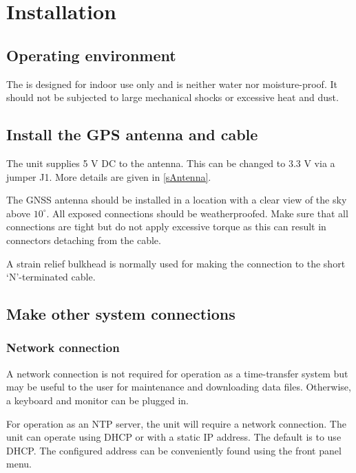 
\section{Installation}

\subsection{Operating environment}

The \sysname{} is designed for indoor use only and is neither water nor moisture-proof.
It should not be subjected to large mechanical shocks or excessive heat and dust.

\subsection{Install the GPS antenna and cable}

The unit supplies 5 V DC to the antenna. This can be changed to 3.3 V via a jumper J1.
More details are given in \ref{sAntenna}.

The GNSS antenna should be installed in a location with a clear
view of the sky above $10^{\circ}$. All exposed connections should be
weatherproofed. Make sure that all connections are tight but do not apply
excessive torque as this can result in connectors detaching from the cable.

A strain relief bulkhead is normally used for making the connection to the short 
`N'-terminated cable. 

\subsection{Make other system connections}


\subsubsection{Network connection}

A network connection is not required for operation as a time-transfer system
but may be useful to the user for maintenance and downloading data files. Otherwise, 
a keyboard and monitor can be plugged in.

For operation as an NTP server, the unit will require a network connection.
The unit can operate using DHCP or with
a static IP address. The default is to use DHCP. The configured address can be conveniently found using the 
front panel menu.

